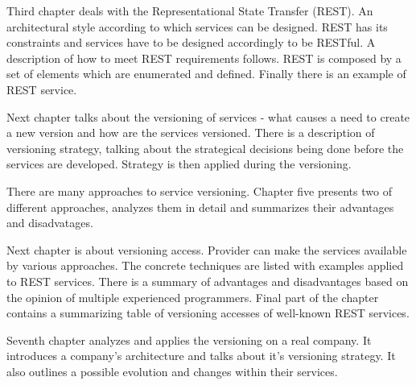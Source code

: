 Third chapter deals with the Representational State Transfer (REST). An architectural style according to which services can be designed. REST has its constraints and services have to be designed accordingly to be RESTful. A description of how to meet REST requirements follows. REST is composed by a set of elements which are enumerated and defined. Finally there is an example of REST service.

Next chapter talks about the versioning of services - what causes a need to create a new version and how are the services versioned. There is a description of versioning strategy, talking about the strategical decisions being done before the services are developed. Strategy is then applied during the versioning. 

There are many approaches to service versioning. Chapter five presents two  of different approaches, analyzes them in detail and summarizes their advantages and disadvatages.

Next chapter is about versioning access. Provider can make the services available by various approaches. The concrete techniques are listed with examples applied to REST services. There is a summary of advantages and disadvantages based on the opinion of multiple experienced programmers. Final part of the chapter contains a summarizing table of versioning accesses of well-known REST services.

Seventh chapter analyzes and applies the versioning on a real company. It introduces a company’s architecture and talks about it’s versioning strategy. It also outlines a possible evolution and changes within their services.
